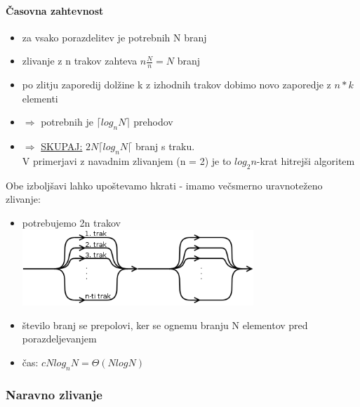 \documentclass[a4paper,10pt]{article}
\begin{document}
\paragraph{\v Casovna zahtevnost}
\begin{itemize}
\item za vsako porazdelitev je potrebnih N branj
\item zlivanje z n trakov zahteva $n \frac{N}{n} = N$ branj
\item po zlitju zaporedij dol\v zine k z izhodnih trakov dobimo novo zaporedje z $n*k$ elementi
\item $\Rightarrow$ potrebnih je $\lceil log_nN \rceil$ prehodov
\item $\Rightarrow$ \underline{SKUPAJ:} $2N\lceil log_nN \lceil$ branj s traku.\\
	V primerjavi z navadnim zlivanjem (n = 2) je to $log_2n$-krat hitrej\v si algoritem
\end{itemize}
Obe izbolj\v savi lahko upo\v stevamo hkrati - imamo ve\v csmerno uravnote\v zeno zlivanje:
\begin{itemize}
\item potrebujemo 2n trakov\\
	\includegraphics[width=8.7cm,height=2.85cm]{Slike/VecsmernoZlivanjeZamisel.png}
\item \v stevilo branj se prepolovi, ker se ognemu branju N elementov pred porazdeljevanjem
\item \v cas: $cNlog_nN = \Theta (N log N)$
\end{itemize}

\subsubsection{Naravno zlivanje}
\end{document}
